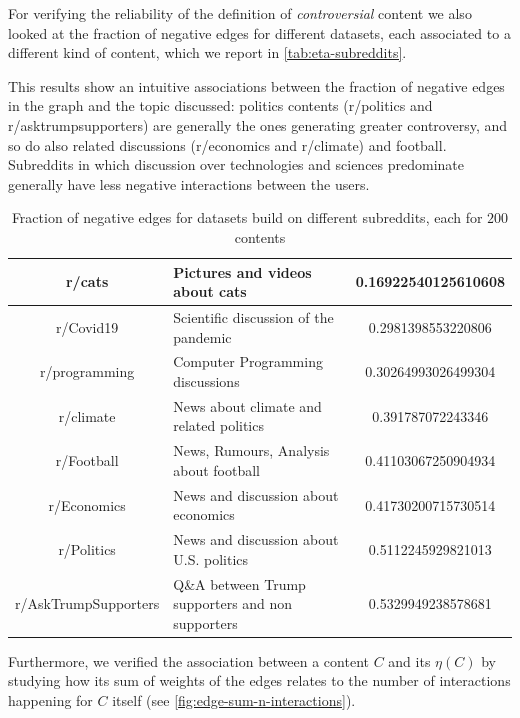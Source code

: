 \bigskip
For verifying the reliability of the definition of \emph{controversial} content
we also looked at the fraction of negative edges for different datasets, each
associated to a different kind of content, which we report in
\autoref{tab:eta-subreddits}.

This results show an intuitive associations between the fraction of negative edges in the
graph and the topic discussed: politics contents
(r/politics and r/asktrumpsupporters) are generally the ones generating greater
controversy, and so do also related discussions (r/economics and r/climate) and
football. Subreddits in which discussion over technologies and sciences
predominate generally have less negative interactions between the users.

\begin{table}
	\centering
	\caption[Fraction of negative edges in different subreddits]{Fraction of negative edges for datasets build on different
		subreddits, each for $200$ contents}
	\label{tab:eta-subreddits}
	{\small
		\begin{tabular}{c | p{6cm} | c}
			r/cats               & Pictures and videos about cats                & \num{0.16922540125610608} \\
			\hline
			r/Covid19            & Scientific discussion of the pandemic         & \num{0.2981398553220806}  \\
			\hline
			r/programming        & Computer Programming discussions              & \num{0.30264993026499304} \\
			\hline
			r/climate            & News about climate and related politics       & \num{0.391787072243346}   \\
			\hline
			r/Football           & News, Rumours, Analysis about \mbox{football} & \num{0.41103067250904934} \\
			\hline
			r/Economics          & News and discussion about economics           & \num{0.41730200715730514} \\
			\hline
			r/Politics           & News and discussion about U.S. politics       & \num{0.5112245929821013}  \\
			\hline
			r/AskTrumpSupporters & {Q\&A between Trump supporters and non
			supporters}          & \num{0.5329949238578681}                                                  \\
		\end{tabular}
	}
\end{table}

\bigskip
Furthermore, we verified the association between a content $C$ and its
$\eta(C)$ by studying how its sum of weights of the edges relates to the number
of interactions happening for $C$ itself (see \autoref{fig:edge-sum-n-interactions}).

